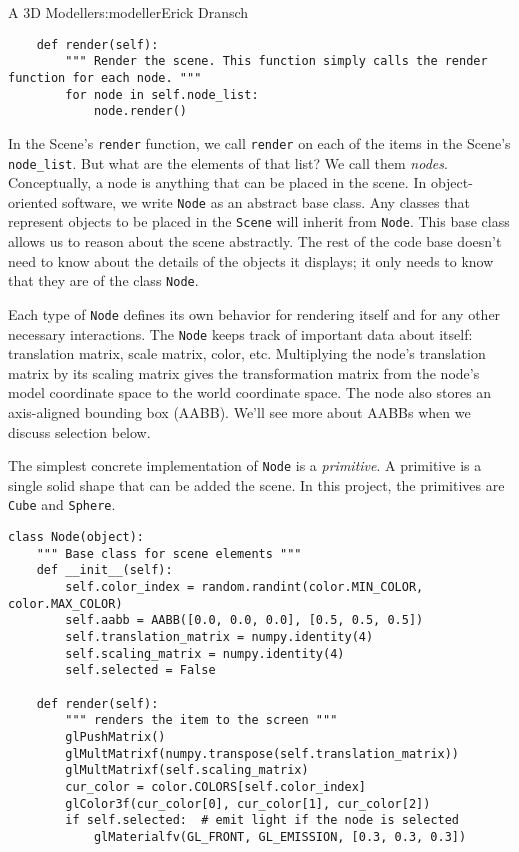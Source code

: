 \begin{aosachapter}{A 3D Modeller}{s:modeller}{Erick Dransch}
\begin{verbatim}
    def render(self):
        """ Render the scene. This function simply calls the render function for each node. """
        for node in self.node_list:
            node.render()
\end{verbatim}

\label{nodes}

In the Scene's \texttt{render} function, we call \texttt{render} on each
of the items in the Scene's \texttt{node\_list}. But what are the
elements of that list? We call them \emph{nodes}. Conceptually, a node
is anything that can be placed in the scene. In object-oriented
software, we write \texttt{Node} as an abstract base class. Any classes
that represent objects to be placed in the \texttt{Scene} will inherit
from \texttt{Node}. This base class allows us to reason about the scene
abstractly. The rest of the code base doesn't need to know about the
details of the objects it displays; it only needs to know that they are
of the class \texttt{Node}.

Each type of \texttt{Node} defines its own behavior for rendering itself
and for any other necessary interactions. The \texttt{Node} keeps track
of important data about itself: translation matrix, scale matrix, color,
etc. Multiplying the node's translation matrix by its scaling matrix
gives the transformation matrix from the node's model coordinate space
to the world coordinate space. The node also stores an axis-aligned
bounding box (AABB). We'll see more about AABBs when we discuss
selection below.

The simplest concrete implementation of \texttt{Node} is a
\emph{primitive}. A primitive is a single solid shape that can be added
the scene. In this project, the primitives are \texttt{Cube} and
\texttt{Sphere}.

\begin{verbatim}
class Node(object):
    """ Base class for scene elements """
    def __init__(self):
        self.color_index = random.randint(color.MIN_COLOR, color.MAX_COLOR)
        self.aabb = AABB([0.0, 0.0, 0.0], [0.5, 0.5, 0.5])
        self.translation_matrix = numpy.identity(4)
        self.scaling_matrix = numpy.identity(4)
        self.selected = False

    def render(self):
        """ renders the item to the screen """
        glPushMatrix()
        glMultMatrixf(numpy.transpose(self.translation_matrix))
        glMultMatrixf(self.scaling_matrix)
        cur_color = color.COLORS[self.color_index]
        glColor3f(cur_color[0], cur_color[1], cur_color[2])
        if self.selected:  # emit light if the node is selected
            glMaterialfv(GL_FRONT, GL_EMISSION, [0.3, 0.3, 0.3])
        

\end{verbatim}
\end{aosachapter}
